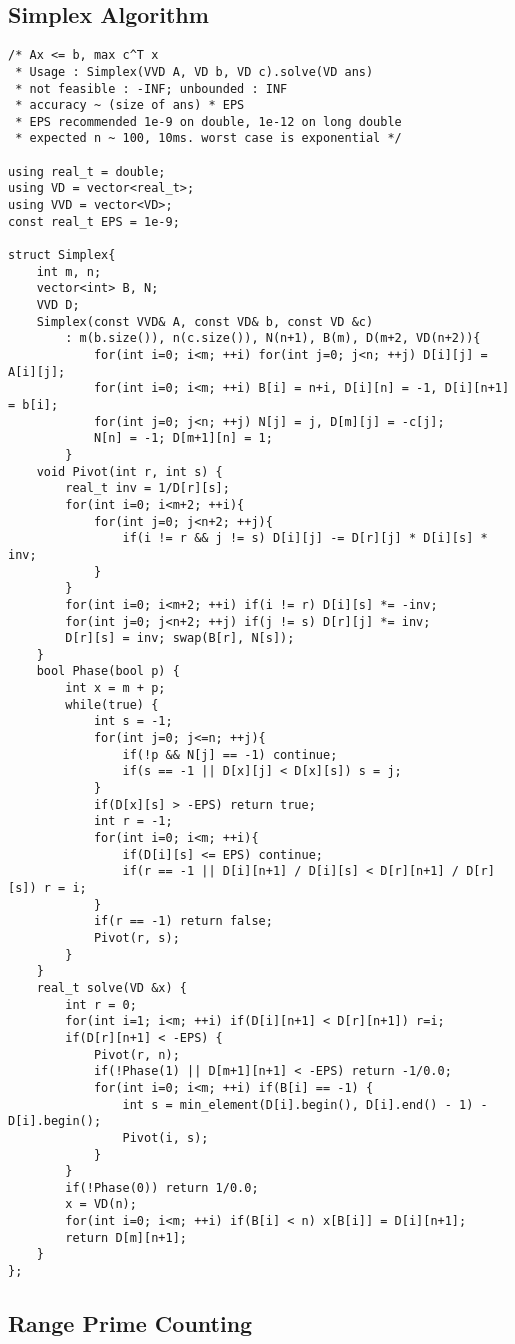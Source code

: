 \documentclass[landscape, 10pt, a4paper, oneside,  twocolumn]{article}
\begin{document}
\subsection{Simplex Algorithm}
\begin{verbatim}
/* Ax <= b, max c^T x
 * Usage : Simplex(VVD A, VD b, VD c).solve(VD ans)
 * not feasible : -INF; unbounded : INF
 * accuracy ~ (size of ans) * EPS
 * EPS recommended 1e-9 on double, 1e-12 on long double
 * expected n ~ 100, 10ms. worst case is exponential */

using real_t = double;
using VD = vector<real_t>;
using VVD = vector<VD>;
const real_t EPS = 1e-9;

struct Simplex{
	int m, n;
	vector<int> B, N;
	VVD D;
	Simplex(const VVD& A, const VD& b, const VD &c)
		: m(b.size()), n(c.size()), N(n+1), B(m), D(m+2, VD(n+2)){
			for(int i=0; i<m; ++i) for(int j=0; j<n; ++j) D[i][j] = A[i][j];
			for(int i=0; i<m; ++i) B[i] = n+i, D[i][n] = -1, D[i][n+1] = b[i];
			for(int j=0; j<n; ++j) N[j] = j, D[m][j] = -c[j];
			N[n] = -1; D[m+1][n] = 1;
		}
	void Pivot(int r, int s) {
		real_t inv = 1/D[r][s];
		for(int i=0; i<m+2; ++i){
			for(int j=0; j<n+2; ++j){
				if(i != r && j != s) D[i][j] -= D[r][j] * D[i][s] * inv;
			}
		}
		for(int i=0; i<m+2; ++i) if(i != r) D[i][s] *= -inv;
		for(int j=0; j<n+2; ++j) if(j != s) D[r][j] *= inv;
		D[r][s] = inv; swap(B[r], N[s]);
	}
	bool Phase(bool p) {
		int x = m + p;
		while(true) {
			int s = -1;
			for(int j=0; j<=n; ++j){
				if(!p && N[j] == -1) continue;
				if(s == -1 || D[x][j] < D[x][s]) s = j;
			}
			if(D[x][s] > -EPS) return true;
			int r = -1;
			for(int i=0; i<m; ++i){
				if(D[i][s] <= EPS) continue;
				if(r == -1 || D[i][n+1] / D[i][s] < D[r][n+1] / D[r][s]) r = i;
			}
			if(r == -1) return false;
			Pivot(r, s);
		}
	}
	real_t solve(VD &x) {
		int r = 0;
		for(int i=1; i<m; ++i) if(D[i][n+1] < D[r][n+1]) r=i;
		if(D[r][n+1] < -EPS) {
			Pivot(r, n);
			if(!Phase(1) || D[m+1][n+1] < -EPS) return -1/0.0;
			for(int i=0; i<m; ++i) if(B[i] == -1) {
				int s = min_element(D[i].begin(), D[i].end() - 1) - D[i].begin();
				Pivot(i, s);
			}
		}
		if(!Phase(0)) return 1/0.0;
		x = VD(n);
		for(int i=0; i<m; ++i) if(B[i] < n) x[B[i]] = D[i][n+1];
		return D[m][n+1];
	}
};
\end{verbatim}

\subsection{Range Prime Counting}
\end{document}
